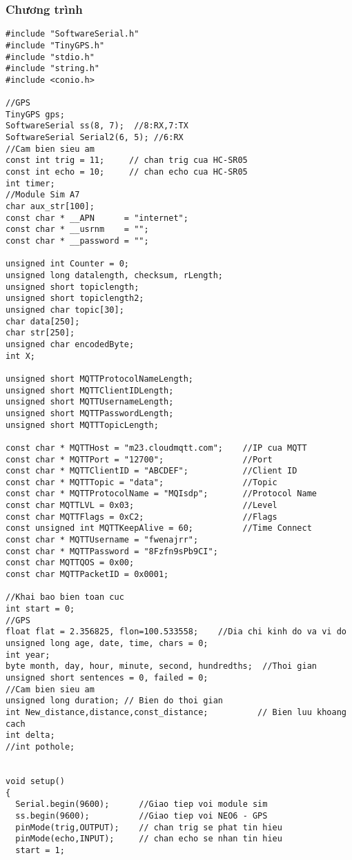 \subsubsection{Chương trình}
\begin{lstlisting}[style=myArduino]
#include "SoftwareSerial.h"
#include "TinyGPS.h"
#include "stdio.h"
#include "string.h"
#include <conio.h>

//GPS
TinyGPS gps;
SoftwareSerial ss(8, 7);  //8:RX,7:TX
SoftwareSerial Serial2(6, 5); //6:RX
//Cam bien sieu am
const int trig = 11;     // chan trig cua HC-SR05
const int echo = 10;     // chan echo cua HC-SR05
int timer;
//Module Sim A7
char aux_str[100];
const char * __APN      = "internet";
const char * __usrnm    = "";
const char * __password = "";

unsigned int Counter = 0;
unsigned long datalength, checksum, rLength;
unsigned short topiclength;
unsigned short topiclength2;
unsigned char topic[30];
char data[250];
char str[250];
unsigned char encodedByte;
int X;

unsigned short MQTTProtocolNameLength;
unsigned short MQTTClientIDLength;
unsigned short MQTTUsernameLength;
unsigned short MQTTPasswordLength;
unsigned short MQTTTopicLength;

const char * MQTTHost = "m23.cloudmqtt.com";    //IP cua MQTT 
const char * MQTTPort = "12700";                //Port
const char * MQTTClientID = "ABCDEF";           //Client ID
const char * MQTTTopic = "data";                //Topic
const char * MQTTProtocolName = "MQIsdp";       //Protocol Name
const char MQTTLVL = 0x03;                      //Level
const char MQTTFlags = 0xC2;                    //Flags
const unsigned int MQTTKeepAlive = 60;          //Time Connect
const char * MQTTUsername = "fwenajrr";        
const char * MQTTPassword = "8Fzfn9sPb9CI";
const char MQTTQOS = 0x00;
const char MQTTPacketID = 0x0001;

//Khai bao bien toan cuc
int start = 0;
//GPS
float flat = 2.356825, flon=100.533558;    //Dia chi kinh do va vi do
unsigned long age, date, time, chars = 0;
int year;
byte month, day, hour, minute, second, hundredths;  //Thoi gian
unsigned short sentences = 0, failed = 0;
//Cam bien sieu am
unsigned long duration; // Bien do thoi gian
int New_distance,distance,const_distance;          // Bien luu khoang cach
int delta;
//int pothole;


void setup()
{
  Serial.begin(9600);      //Giao tiep voi module sim
  ss.begin(9600);          //Giao tiep voi NEO6 - GPS
  pinMode(trig,OUTPUT);    // chan trig se phat tin hieu
  pinMode(echo,INPUT);     // chan echo se nhan tin hieu
  start = 1;
  

\end{lstlisting}
